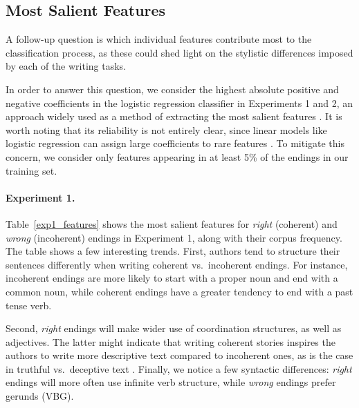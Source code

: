 \documentclass[11pt,a4paper]{article}
\newcommand{\tabref}[1]{Table~\ref{#1}}
\begin{document}
\subsection{Most Salient Features}
A follow-up question is which individual features contribute most to the classification process,
as these could shed light on the stylistic differences imposed by each of the writing tasks.

In order to answer this question, we consider the highest absolute
positive and negative coefficients in the logistic regression
classifier in Experiments 1 and 2, an approach widely used  as a
method of extracting the most salient features
\cite{Nguyen:2013,Burke:2013,Brooks:2013}. It is worth noting
  that its reliability is not entirely clear, since linear models like
  logistic regression can assign large coefficients to rare features \cite{Yano:2012}.
To mitigate this concern, we consider only features appearing in at least 5\% of the endings in our training set. 

\paragraph{Experiment 1.}
\tabref{exp1_features} shows the most salient features for {\it right} (coherent) and {\it wrong} (incoherent) endings in Experiment 1,
along with their corpus frequency. 
The table shows a few interesting trends. 
First, authors tend to structure their sentences differently when writing {coherent}  vs.~{incoherent} endings.
For instance, {incoherent} endings are more likely to start with a proper noun and end with a common noun, 
while coherent endings have a greater tendency to end with a past tense verb.

Second, {\it right} endings will make wider use of coordination structures, as well as adjectives.
The latter might indicate that writing coherent stories inspires the authors to write more descriptive text compared to incoherent ones, 
as is the case in truthful vs.~deceptive text \cite{ott2011finding}.
Finally, we notice a few syntactic differences: {\it right} endings will more often use infinite verb structure, while {\it wrong} endings prefer gerunds (VBG). 
\end{document}
